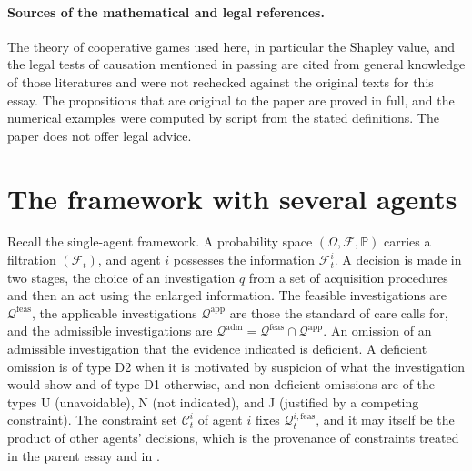 \documentclass[11pt]{article}
\newcommand{\F}{\mathcal F}
\newcommand{\Q}{\mathcal Q}
\newcommand{\C}{\mathcal C}
\newcommand{\PP}{\mathbb P}
\newcommand{\feas}{\mathrm{feas}}
\newcommand{\adm}{\mathrm{adm}}
\newcommand{\app}{\mathrm{app}}
\theoremstyle{plain}
\theoremstyle{definition}
\begin{document}
\paragraph{Sources of the mathematical and legal references.} The theory of cooperative games used here, in particular the Shapley value, and the legal tests of causation mentioned in passing are cited from general knowledge of those literatures and were not rechecked against the original texts for this essay. The propositions that are original to the paper are proved in full, and the numerical examples were computed by script from the stated definitions. The paper does not offer legal advice.

\section{The framework with several agents}\label{sec:framework}

Recall the single-agent framework. A probability space $(\Omega,\F,\PP)$ carries a filtration $(\F_t)$, and agent $i$ possesses the information $\F^i_t$. A decision is made in two stages, the choice of an investigation $q$ from a set of acquisition procedures and then an act using the enlarged information. The feasible investigations are $\Q^{\feas}$, the applicable investigations $\Q^{\app}$ are those the standard of care calls for, and the admissible investigations are $\Q^{\adm}=\Q^{\feas}\cap\Q^{\app}$. An omission of an admissible investigation that the evidence indicated is deficient. A deficient omission is of type D2 when it is motivated by suspicion of what the investigation would show and of type D1 otherwise, and non-deficient omissions are of the types U (unavoidable), N (not indicated), and J (justified by a competing constraint). The constraint set $\C^i_t$ of agent $i$ fixes $\Q^{i,\feas}_t$, and it may itself be the product of other agents' decisions, which is the provenance of constraints treated in the parent essay and in \cite{flyxion2026inputs}.
\end{document}
